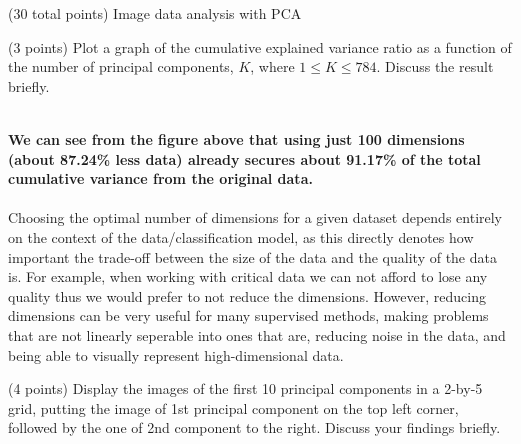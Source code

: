 \documentclass[12pt]{article}
\begin{document}
\begin{question}{(30 total points) Image data analysis with PCA}
\begin{subquestion}{(3 points)
       Plot a graph of the cumulative explained variance ratio as a function of the number of principal components, $K$, where $1\le K \le 784$.
       Discuss the result briefly.
     }
\begin{answerbox}{54em}
{\\
        \textbf{We can see from the figure above that using just 100 dimensions (about 87.24\% less data) already secures about 91.17\% of the total cumulative variance from the original data.}\\
\\
        Choosing the optimal number of dimensions for a given dataset depends entirely on the context of the data/classification model, as this directly denotes how important the trade-off between the size of the data and the quality of the data is. For example, when working with critical data we can not afford to lose any quality thus we would prefer to not reduce the dimensions. However, reducing dimensions can be very useful for many supervised methods, making problems that are not linearly seperable into ones that are, reducing noise in the data, and being able to visually represent high-dimensional data.
        }
      \end{answerbox}
  


   \end{subquestion}

   \begin{subquestion}{(4 points)
      Display the images of the first 10 principal components in
      a 2-by-5 grid, putting the image of 1st principal component on
      the top left corner, followed by the one of 2nd component to the right.
      Discuss your findings briefly.
     } \label{Q1.disp.pca}
   


\end{subquestion}
\end{question}
\end{document}
